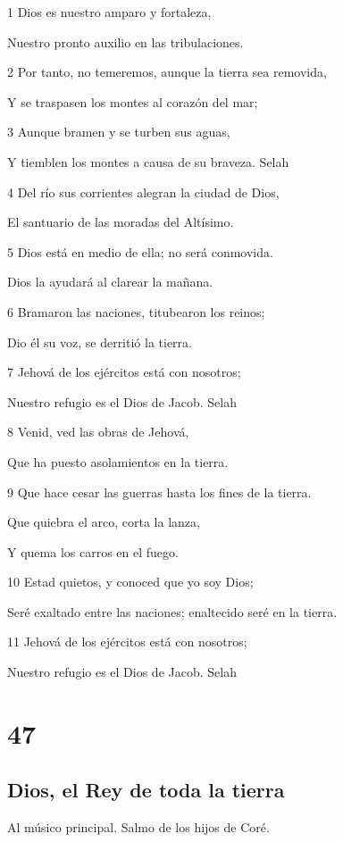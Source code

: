 \par 1 Dios es nuestro amparo y fortaleza,
\par Nuestro pronto auxilio en las tribulaciones.
\par 2 Por tanto, no temeremos, aunque la tierra sea removida,
\par Y se traspasen los montes al corazón del mar;
\par 3 Aunque bramen y se turben sus aguas,
\par Y tiemblen los montes a causa de su braveza. Selah
\par 4 Del río sus corrientes alegran la ciudad de Dios,
\par El santuario de las moradas del Altísimo.
\par 5 Dios está en medio de ella; no será conmovida.
\par Dios la ayudará al clarear la mañana.
\par 6 Bramaron las naciones, titubearon los reinos;
\par Dio él su voz, se derritió la tierra.
\par 7 Jehová de los ejércitos está con nosotros;
\par Nuestro refugio es el Dios de Jacob. Selah
\par 8 Venid, ved las obras de Jehová,
\par Que ha puesto asolamientos en la tierra.
\par 9 Que hace cesar las guerras hasta los fines de la tierra.
\par Que quiebra el arco, corta la lanza,
\par Y quema los carros en el fuego.
\par 10 Estad quietos, y conoced que yo soy Dios;
\par Seré exaltado entre las naciones; enaltecido seré en la tierra.
\par 11 Jehová de los ejércitos está con nosotros;
\par Nuestro refugio es el Dios de Jacob. Selah

\chapter{47}

\section*{Dios, el Rey de toda la tierra}

\par Al músico principal. Salmo de los hijos de Coré.

